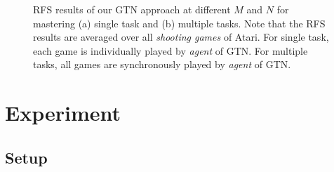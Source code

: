 \documentclass[letterpaper]{article} %
\begin{document}
\begin{figure}[htb]
  \centering
  \caption{RFS results of our GTN approach at different $M$ and $N$ for mastering (a) single task and (b) multiple tasks. Note that the RFS results are averaged over all \textit{shooting games} of Atari. For single task, each game is individually played by \textit{agent} of GTN. For multiple tasks, all games are synchronously played by \textit{agent} of GTN.
  }
\end{figure}


\section{Experiment}

\subsection{Setup}
\label{section-exp-setup}
\end{document}
